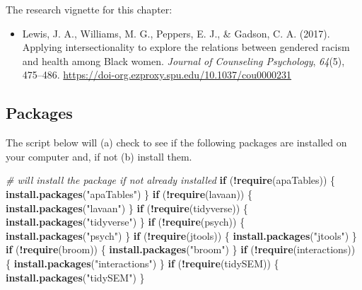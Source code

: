 \documentclass[
  11pt,
]{book}
\newenvironment{Shaded}{\begin{snugshade}}{\end{snugshade}}
\newcommand{\CommentTok}[1]{\textcolor[rgb]{0.37,0.37,0.37}{\textit{#1}}}
\newcommand{\ControlFlowTok}[1]{\textcolor[rgb]{0.27,0.27,0.27}{\textbf{#1}}}
\newcommand{\FunctionTok}[1]{\textcolor[rgb]{0.27,0.27,0.27}{\textbf{#1}}}
\newcommand{\NormalTok}[1]{#1}
\newcommand{\SpecialCharTok}[1]{\textcolor[rgb]{0.43,0.43,0.43}{\textbf{#1}}}
\newcommand{\StringTok}[1]{\textcolor[rgb]{0.5,0.5,0.5}{#1}}
\providecommand{\tightlist}{%
  \setlength{\itemsep}{0pt}\setlength{\parskip}{0pt}}
\begin{document}
The research vignette for this chapter:

\begin{itemize}
\tightlist
\item
  Lewis, J. A., Williams, M. G., Peppers, E. J., \& Gadson, C. A. (2017). Applying intersectionality to explore the relations between gendered racism and health among Black women. \emph{Journal of Counseling Psychology}, \emph{64}(5), 475--486. \url{https://doi-org.ezproxy.spu.edu/10.1037/cou0000231}
\end{itemize}

\hypertarget{packages-6}{%
\subsection{Packages}\label{packages-6}}

The script below will (a) check to see if the following packages are installed on your computer and, if not (b) install them.

\begin{Shaded}
\begin{Highlighting}[]
\CommentTok{\# will install the package if not already installed}
\ControlFlowTok{if}\NormalTok{ (}\SpecialCharTok{!}\FunctionTok{require}\NormalTok{(apaTables)) \{}
    \FunctionTok{install.packages}\NormalTok{(}\StringTok{"apaTables"}\NormalTok{)}
\NormalTok{\}}
\ControlFlowTok{if}\NormalTok{ (}\SpecialCharTok{!}\FunctionTok{require}\NormalTok{(lavaan)) \{}
    \FunctionTok{install.packages}\NormalTok{(}\StringTok{"lavaan"}\NormalTok{)}
\NormalTok{\}}
\ControlFlowTok{if}\NormalTok{ (}\SpecialCharTok{!}\FunctionTok{require}\NormalTok{(tidyverse)) \{}
    \FunctionTok{install.packages}\NormalTok{(}\StringTok{"tidyverse"}\NormalTok{)}
\NormalTok{\}}
\ControlFlowTok{if}\NormalTok{ (}\SpecialCharTok{!}\FunctionTok{require}\NormalTok{(psych)) \{}
    \FunctionTok{install.packages}\NormalTok{(}\StringTok{"psych"}\NormalTok{)}
\NormalTok{\}}
\ControlFlowTok{if}\NormalTok{ (}\SpecialCharTok{!}\FunctionTok{require}\NormalTok{(jtools)) \{}
    \FunctionTok{install.packages}\NormalTok{(}\StringTok{"jtools"}\NormalTok{)}
\NormalTok{\}}
\ControlFlowTok{if}\NormalTok{ (}\SpecialCharTok{!}\FunctionTok{require}\NormalTok{(broom)) \{}
    \FunctionTok{install.packages}\NormalTok{(}\StringTok{"broom"}\NormalTok{)}
\NormalTok{\}}
\ControlFlowTok{if}\NormalTok{ (}\SpecialCharTok{!}\FunctionTok{require}\NormalTok{(interactions)) \{}
    \FunctionTok{install.packages}\NormalTok{(}\StringTok{"interactions"}\NormalTok{)}
\NormalTok{\}}
\ControlFlowTok{if}\NormalTok{ (}\SpecialCharTok{!}\FunctionTok{require}\NormalTok{(tidySEM)) \{}
    \FunctionTok{install.packages}\NormalTok{(}\StringTok{"tidySEM"}\NormalTok{)}
\NormalTok{\}}
\end{Highlighting}
\end{Shaded}
\end{document}
